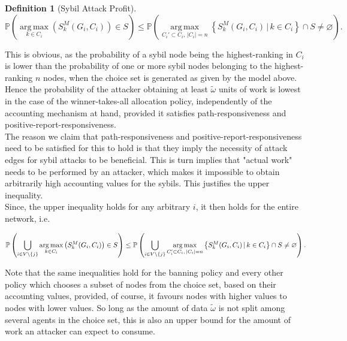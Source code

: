 \documentclass[11pt,a4paper]{article}
\theoremstyle{definition}
\newtheorem{definition}{Definition}[section]
\theoremstyle{theorem}
\theoremstyle{proposition}
\theoremstyle{corollary}
\theoremstyle{lemma}
\theoremstyle{example}
\theoremstyle{remark}
\DeclareMathOperator*{\argmax}{arg\,max}
\begin{document}
\begin{definition}[Sybil Attack Profit]
\[
\mathbb{P}\left(\argmax\limits_{k\in{}C_i}\left(S_k^M(G_i,C_i)\right)\in{}S\right) \leq \mathbb{P}\left(\argmax\limits_{C_i'\subset{}C_i,\,|C_i|=n}\left\lbrace{}S_k^M(G_i,C_i)\,|\,k\in{}C_i\right\rbrace\cap{}S \neq \varnothing\right).
\]

\noindent{}This is obvious, as the probability of a sybil node being the highest-ranking in $C_i$ is lower than the probability of one or more sybil nodes belonging to the highest-ranking $n$ nodes, when the choice set is generated as given by the model above. Hence the probability of the attacker obtaining at least $\tilde{\omega}$ units of work is lowest in the case of the winner-takes-all allocation policy, independently of the accounting mechanism at hand, provided it satisfies path-responsiveness and positive-report-responsiveness.\vspace{1em}\\

\noindent{}The reason we claim that path-responsiveness and positive-report-responsiveness need to be satisfied for this to hold is that they imply the necessity of attack edges for sybil attacks to be beneficial. This is turn implies that "actual work" needs to be performed by an attacker, which makes it impossible to obtain arbitrarily high accounting values for the sybils. This justifies the upper inequality. \vspace{1em}\\

\noindent{}Since, the upper inequality holds for any arbitrary $i$, it then holds for the entire network, i.e.

\[
\mathbb{P}\left(\bigcup\limits_{i\in{}V\backslash\lbrace{}j\rbrace}\argmax\limits_{k\in{}C_i}\left(S_k^M(G_i,C_i)\right)\in{}S\right) \leq \mathbb{P}\left(\bigcup\limits_{i\in{}V\backslash\lbrace{}j\rbrace}\argmax\limits_{C_i'\subset{}C_i,\,|C_i|=n}\left\lbrace{}S_k^M(G_i,C_i)\,|\,k\in{}C_i\right\rbrace\cap{}S\neq\varnothing\right). \vspace{1em}\\
\] 

\noindent{}Note that the same inequalities hold for the banning policy and every other policy which chooses a subset of nodes from the choice set, based on their accounting values, provided, of course, it favours nodes with higher values to nodes with lower values. So long as the amount of data $\tilde{\omega}$ is not split among several agents in the choice set, this is also an upper bound for the amount of work an attacker can expect to consume.\vspace{1em}\\


\end{definition}
\end{document}
